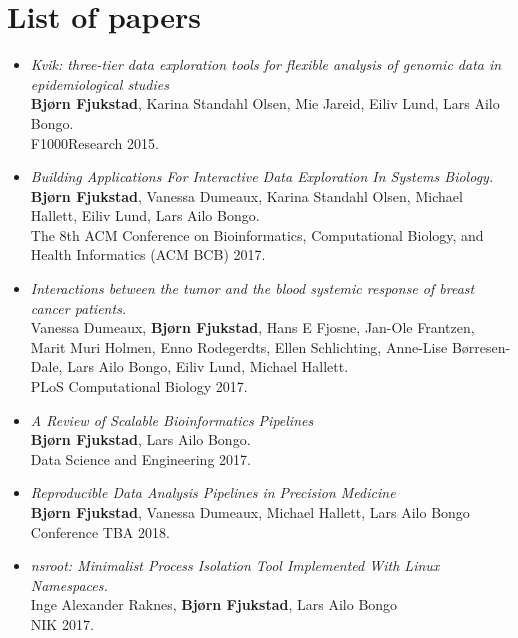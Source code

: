 \section{List of papers} 
\begin{itemize}
    \item
        \emph{Kvik: three-tier data exploration tools for flexible analysis of
        genomic data in epidemiological studies}
        \\
        \textbf{Bjørn Fjukstad}, Karina Standahl Olsen, Mie Jareid, Eiliv Lund,
        Lars Ailo Bongo. 
        \\ 
        F1000Research 2015.
        
    \item 
        \emph{Building Applications For Interactive Data Exploration In Systems
        Biology.}
        \\
        \textbf{Bjørn Fjukstad}, Vanessa Dumeaux, Karina Standahl Olsen, Michael
        Hallett, Eiliv Lund, Lars Ailo Bongo.  
        \\ 
        The 8th ACM Conference on Bioinformatics, Computational Biology, and
        Health Informatics (ACM BCB) 2017.

    \item 
        \emph{Interactions between the tumor and the blood systemic response of
        breast cancer patients.}
        \\ 
        Vanessa Dumeaux, \textbf{Bjørn Fjukstad}, Hans E Fjosne, Jan-Ole
        Frantzen, Marit Muri Holmen, Enno Rodegerdts, Ellen Schlichting,
        Anne-Lise Børresen-Dale, Lars Ailo Bongo, Eiliv Lund, Michael Hallett.
        \\ 
        PLoS Computational Biology 2017.

    \item \emph{A Review of Scalable Bioinformatics Pipelines} 
        \\
        \textbf{Bjørn Fjukstad}, Lars Ailo Bongo.
        \\ 
        Data Science and Engineering 2017.

    \item \emph{Reproducible Data Analysis Pipelines in Precision Medicine}
        \\
        \textbf{Bjørn Fjukstad}, Vanessa Dumeaux, Michael Hallett, Lars Ailo
        Bongo
        \\
        Conference TBA 2018. 


    \item \emph{nsroot: Minimalist Process Isolation Tool Implemented With Linux
        Namespaces.}
        \\
        Inge Alexander Raknes, \textbf{Bjørn Fjukstad}, Lars Ailo Bongo 
        \\
        NIK 2017. 
        
\end{itemize} 

